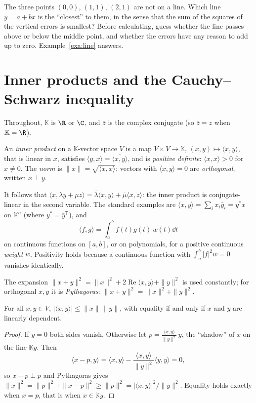 \begin{think}
The three points $(0,0)$, $(1,1)$, $(2,1)$ are not on a line. Which line $y=a+bx$ is the ``closest'' to them, in the
sense that the sum of the squares of the vertical errors is smallest? Before calculating, guess whether the line passes
above or below the middle point, and whether the errors have any reason to add up to zero. Example~\ref{exa:line} answers.
\end{think}

\section{Inner products and the Cauchy--Schwarz inequality}

Throughout, $\mathbb K$ is $\R$ or $\C$, and $\bar z$ is the complex conjugate (so $\bar z=z$ when $\mathbb K=\R$).

\begin{definition}\label{def:inner}
An \emph{inner product} on a $\mathbb K$-vector space $V$ is a map $V\times V\to\mathbb K$, $(x,y)\mapsto\langle x,y\rangle$,
that is linear in $x$, satisfies $\langle y,x\rangle=\overline{\langle x,y\rangle}$, and is \emph{positive definite}:
$\langle x,x\rangle>0$ for $x\ne0$. The \emph{norm} is $\|x\|=\sqrt{\langle x,x\rangle}$; vectors with $\langle x,y\rangle=0$
are \emph{orthogonal}, written $x\perp y$.
\end{definition}

It follows that $\langle x,\lambda y+\mu z\rangle=\bar\lambda\langle x,y\rangle+\bar\mu\langle x,z\rangle$: the inner
product is conjugate-linear in the second variable. The standard examples are $\langle x,y\rangle=\sum_ix_i\bar y_i=y^*x$
on $\mathbb K^n$ (where $y^*=\bar y^{\mathsf T}$), and
\[
\langle f,g\rangle=\int_a^bf(t)\overline{g(t)}\,w(t)\dd t
\]
on continuous functions on $[a,b]$, or on polynomials, for a positive continuous \emph{weight} $w$. Positivity holds
because a continuous function with $\int_a^b|f|^2w=0$ vanishes identically.

The expansion $\|x+y\|^2=\|x\|^2+2\operatorname{Re}\langle x,y\rangle+\|y\|^2$ is used constantly; for orthogonal $x,y$
it is \emph{Pythagoras}: $\|x+y\|^2=\|x\|^2+\|y\|^2$.

\begin{theorem}\label{thm:cs}
For all $x,y\in V$, $|\langle x,y\rangle|\le\|x\|\,\|y\|$, with equality if and only if $x$ and $y$ are linearly dependent.
\end{theorem}
\begin{proof}
If $y=0$ both sides vanish. Otherwise let $p=\frac{\langle x,y\rangle}{\|y\|^2}\,y$, the ``shadow'' of $x$ on the line
$\mathbb Ky$. Then
\[
\langle x-p,y\rangle=\langle x,y\rangle-\frac{\langle x,y\rangle}{\|y\|^2}\langle y,y\rangle=0,
\]
so $x-p\perp p$ and Pythagoras gives $\|x\|^2=\|p\|^2+\|x-p\|^2\ge\|p\|^2=|\langle x,y\rangle|^2/\|y\|^2$. Equality holds
exactly when $x=p$, that is when $x\in\mathbb Ky$.
\end{proof}

